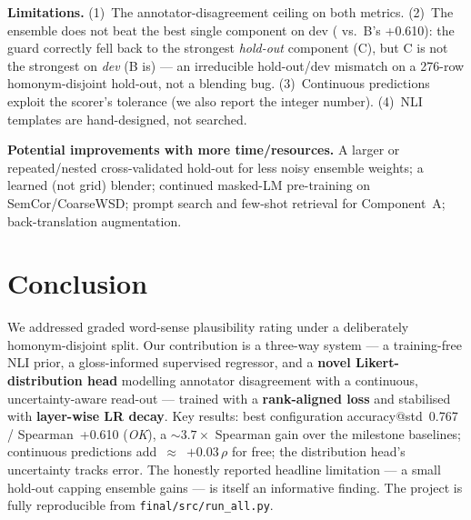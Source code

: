 \documentclass[11pt]{article}
\newcommand{\Bacc}{0.767}\newcommand{\Brho}{+0.610}
\begin{document}
\textbf{Limitations.} (1)~The annotator-disagreement ceiling on both metrics.
(2)~The ensemble does not beat the best single component on dev
(\EnsRho{} vs.\ B's \Brho{}): the guard correctly fell back to the
strongest \emph{hold-out} component (C), but C is not the strongest on
\emph{dev} (B is) --- an irreducible hold-out/dev mismatch on a 276-row
homonym-disjoint hold-out, not a blending bug. (3)~Continuous predictions
exploit the scorer's tolerance (we also report the integer number).
(4)~NLI templates are hand-designed, not searched.

\textbf{Potential improvements with more time/resources.} A larger or
repeated/nested cross-validated hold-out for less noisy ensemble weights; a
learned (not grid) blender; continued masked-LM pre-training on
SemCor/CoarseWSD; prompt search and few-shot retrieval for Component~A;
back-translation augmentation.

\section{Conclusion}
We addressed graded word-sense plausibility rating under a deliberately
homonym-disjoint split. Our contribution is a three-way system --- a
training-free NLI prior, a gloss-informed supervised regressor, and a
\textbf{novel Likert-distribution head} modelling annotator disagreement with
a continuous, uncertainty-aware read-out --- trained with a
\textbf{rank-aligned loss} and stabilised with \textbf{layer-wise LR decay}.
Key results: best configuration accuracy@std~\Bacc{} / Spearman~\Brho{}
(\emph{OK}), a $\sim$$3.7\times$ Spearman gain over the milestone baselines;
continuous predictions add~\mbox{$\approx$}~$+0.03\,\rho$ for free; the
distribution head's uncertainty tracks error. The honestly reported headline
limitation --- a small hold-out capping ensemble gains --- is itself an
informative finding. The project is fully reproducible from
\texttt{final/src/run\_all.py}.

\end{document}
